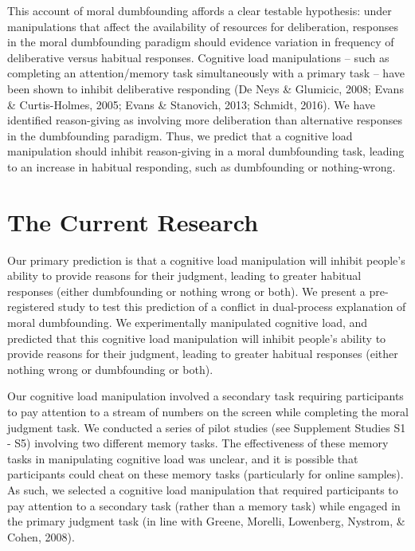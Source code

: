 \documentclass[
  man,floatsintext]{apa6}
\begin{document}
This account of moral dumbfounding affords a clear testable hypothesis: under manipulations that affect the availability of resources for deliberation, responses in the moral dumbfounding paradigm should evidence variation in frequency of deliberative versus habitual responses. Cognitive load manipulations -- such as completing an attention/memory task simultaneously with a primary task -- have been shown to inhibit deliberative responding (De Neys \& Glumicic, 2008; Evans \& Curtis-Holmes, 2005; Evans \& Stanovich, 2013; Schmidt, 2016). We have identified reason-giving as involving more deliberation than alternative responses in the dumbfounding paradigm. Thus, we predict that a cognitive load manipulation should inhibit reason-giving in a moral dumbfounding task, leading to an increase in habitual responding, such as dumbfounding or nothing-wrong.

\hypertarget{the-current-research}{%
\section{The Current Research}\label{the-current-research}}

Our primary prediction is that a cognitive load manipulation will inhibit people's ability to provide reasons for their judgment, leading to greater habitual responses (either dumbfounding or nothing wrong or both). We present a pre-registered study to test this prediction of a conflict in dual-process explanation of moral dumbfounding. We experimentally manipulated cognitive load, and predicted that this cognitive load manipulation will inhibit people's ability to provide reasons for their judgment, leading to greater habitual responses (either nothing wrong or dumbfounding or both).

Our cognitive load manipulation involved a secondary task requiring participants to pay attention to a stream of numbers on the screen while completing the moral judgment task. We conducted a series of pilot studies (see Supplement Studies S1 - S5) involving two different memory tasks. The effectiveness of these memory tasks in manipulating cognitive load was unclear, and it is possible that participants could cheat on these memory tasks (particularly for online samples). As such, we selected a cognitive load manipulation that required participants to pay attention to a secondary task (rather than a memory task) while engaged in the primary judgment task (in line with Greene, Morelli, Lowenberg, Nystrom, \& Cohen, 2008).
\end{document}
